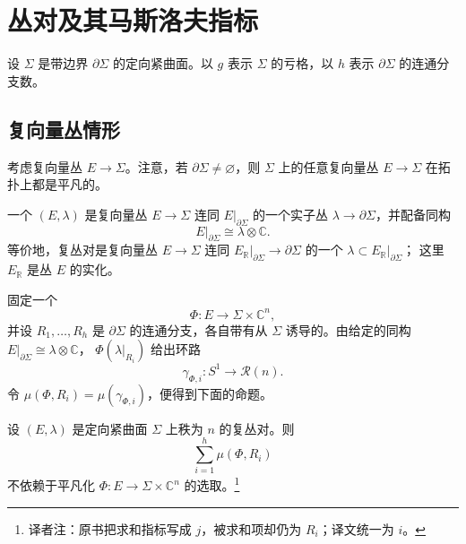 \section{丛对及其马斯洛夫指标}
\label{sec:bundle-pair-maslov-index}

设 $\Sigma$ 是带边界 $\partial\Sigma$ 的定向紧曲面。以 $g$ 表示
$\Sigma$ 的亏格，以 $h$ 表示 $\partial\Sigma$ 的连通分支数。

\subsection{复向量丛情形}
\label{subsec:complex-vector-bundle-pairs}

考虑复向量丛 $E\to\Sigma$。注意，若 $\partial\Sigma\ne\varnothing$，则
$\Sigma$ 上的任意复向量丛 $E\to\Sigma$ 在拓扑上都是平凡的。

\begin{definition}
\label{def:complex-bundle-pair}
一个\termComplexBundlePair{} $(E,\lambda)$ 是复向量丛 $E\to\Sigma$ 连同
$E|_{\partial\Sigma}$ 的一个实子丛 $\lambda\to\partial\Sigma$，并配备同构
\begin{equation}
  E|_{\partial\Sigma}\cong\lambda\otimes\mathbb C.
\label{eq:complex-bundle-boundary-complexification}
\end{equation}
等价地，复丛对是复向量丛 $E\to\Sigma$ 连同
$E_{\mathbb R}|_{\partial\Sigma}\to\partial\Sigma$ 的一个\termTotallyRealSubbundle{}
$\lambda\subset E_{\mathbb R}|_{\partial\Sigma}$；
这里 $E_{\mathbb R}$ 是丛 $E$ 的实化。
\end{definition}

固定一个\termTrivialization{}
\[
  \Phi:E\longrightarrow\Sigma\times\mathbb C^n,
\]
并设 $R_1,\ldots,R_h$ 是 $\partial\Sigma$ 的连通分支，各自带有从
$\Sigma$ 诱导的\termBoundaryOrientation{}。由给定的同构
$E|_{\partial\Sigma}\cong\lambda\otimes\mathbb C$，
$\Phi(\lambda|_{R_i})$ 给出环路
\[
  \gamma_{\Phi,i}:S^1\longrightarrow\mathcal R(n).
\]
令 $\mu(\Phi,R_i)=\mu(\gamma_{\Phi,i})$，便得到下面的命题。

\begin{proposition}
\label{prop:complex-bundle-pair-index-trivialization}
设 $(E,\lambda)$ 是定向紧曲面 $\Sigma$ 上秩为 $n$ 的复丛对。则
\[
  \sum_{i=1}^h\mu(\Phi,R_i)
\]
不依赖于平凡化 $\Phi:E\to\Sigma\times\mathbb C^n$ 的选取。\footnote{译者注：原书把求和指标写成 $j$，被求和项却仍为 $R_i$；译文统一为 $i$。}
\end{proposition}

